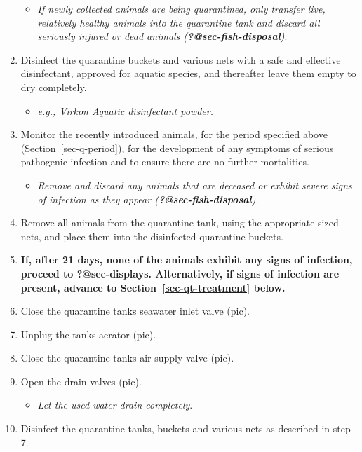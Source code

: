 \documentclass[
  letterpaper,
  DIV=11,
  numbers=noendperiod]{scrreprt}
\providecommand{\tightlist}{%
  \setlength{\itemsep}{0pt}\setlength{\parskip}{0pt}}\usepackage{longtable,booktabs,array}
\begin{document}
\begin{enumerate}
  \begin{itemize}
  \tightlist
  \item
    \emph{If newly collected animals are being quarantined, only
    transfer live, relatively healthy animals into the quarantine tank
    and discard all seriously injured or dead animals
    (\textbf{?@sec-fish-disposal})}.
  \end{itemize}
\item
  Disinfect the quarantine buckets and various nets with a safe and
  effective disinfectant, approved for aquatic species, and thereafter
  leave them empty to dry completely.

  \begin{itemize}
  \tightlist
  \item
    \emph{e.g., Virkon Aquatic disinfectant powder.}
  \end{itemize}
\item
  Monitor the recently introduced animals, for the period specified
  above (Section~\ref{sec-q-period}), for the development of any
  symptoms of serious pathogenic infection and to ensure there are no
  further mortalities.

  \begin{itemize}
  \tightlist
  \item
    \emph{Remove and discard any animals that are deceased or exhibit
    severe signs of infection as they appear
    (\textbf{?@sec-fish-disposal})}.
  \end{itemize}
\item
  Remove all animals from the quarantine tank, using the appropriate
  sized nets, and place them into the disinfected quarantine buckets.
\item
  \textbf{If, after 21 days, none of the animals exhibit any signs of
  infection, proceed to \textbf{?@sec-displays}. Alternatively, if signs
  of infection are present, advance to Section~\ref{sec-qt-treatment}
  below.}
\item
  Close the quarantine tanks seawater inlet valve (pic).
\item
  Unplug the tanks aerator (pic).
\item
  Close the quarantine tanks air supply valve (pic).
\item
  Open the drain valves (pic).

  \begin{itemize}
  \tightlist
  \item
    \emph{Let the used water drain completely}.
  \end{itemize}
\item
  Disinfect the quarantine tanks, buckets and various nets as described
  in step 7.
\end{enumerate}
\end{document}
